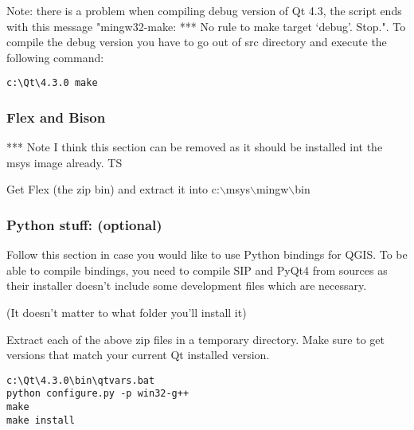 Note: there is a problem when compiling debug version of Qt 4.3, the script ends with
this message  "mingw32-make: *** No rule to make target `debug'.  Stop.". To 
compile the debug version you have to go out of src directory and execute the
following command:

\begin{verbatim}
c:\Qt\4.3.0 make 
\end{verbatim}

\subsubsection{Flex and Bison}
*** Note I think this section can be removed as it should be installed int the
msys image already. TS

Get Flex
(the zip bin) and extract it into c:$\backslash$msys$\backslash$mingw$\backslash$bin

\subsubsection{Python stuff: (optional)}
Follow this section in case you would like to use Python bindings for QGIS.  To
be able to compile bindings, you need to compile SIP and PyQt4 from sources as
their installer doesn't include some development files which are necessary.

(It doesn't matter to what folder you'll install it)




Extract each of the above zip files in a temporary directory. Make sure
to get versions that match your current Qt installed version.

\begin{verbatim}
c:\Qt\4.3.0\bin\qtvars.bat 
python configure.py -p win32-g++ 
make 
make install 
\end{verbatim}

